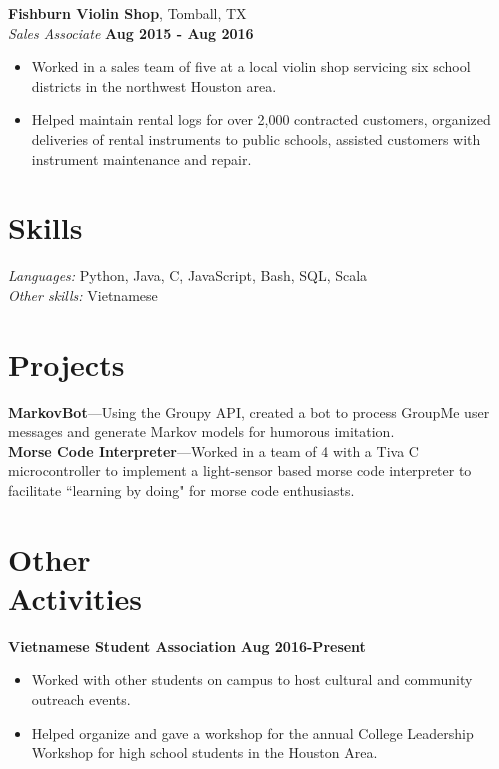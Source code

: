 \documentclass[margin,line]{resume}
\begin{document}
\begin{resume}
\textbf{Fishburn Violin Shop}, Tomball, TX \vspace{2mm}\\\vspace{1mm}%
\textsl{Sales Associate} \hfill \textbf{Aug 2015 -
Aug 2016}
\begin{itemize}
    \item Worked in a sales team of five at a local violin shop servicing six school districts in the northwest Houston area.
    \item Helped maintain rental logs for over 2,000 contracted customers, organized deliveries of rental instruments to public schools, assisted customers with instrument maintenance and repair.
\end{itemize}
\vspace{1mm}%

\section{\mysidestyle Skills}

\emph{Languages: } Python, Java, C, JavaScript, Bash, SQL, Scala\\
\emph{Other skills:} Vietnamese

\section{\mysidestyle Projects}

\textbf{MarkovBot}---Using the Groupy API, created a bot to process GroupMe user messages and generate Markov models for humorous imitation.\vspace{1mm}\\
\textbf{Morse Code Interpreter}---Worked in a team of 4 with a Tiva C microcontroller to implement a light-sensor based morse code interpreter to facilitate ``learning by doing" for morse code enthusiasts.


\section{\mysidestyle Other\\ Activities}
\textbf{Vietnamese Student Association} \hfill \textbf{Aug 2016-Present}
\begin{itemize}
    \item Worked with other students on campus to host cultural and community outreach events.
    \item Helped organize and gave a workshop for the annual College Leadership Workshop for high school students in the Houston Area.
\end{itemize}



\end{resume}
\end{document}
